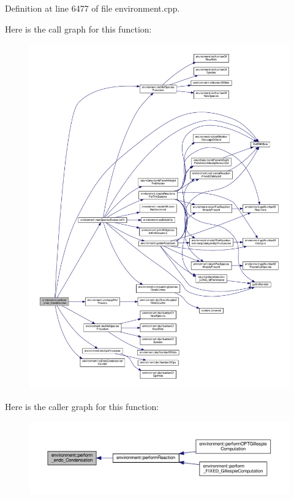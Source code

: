 Definition at line 6477 of file environment.\-cpp.



Here is the call graph for this function\-:\nopagebreak
\begin{figure}[H]
\begin{center}
\leavevmode
\includegraphics[width=350pt]{a00003_aa7a2cc95d8ba242c805a8fda063b23a7_cgraph}
\end{center}
\end{figure}




Here is the caller graph for this function\-:\nopagebreak
\begin{figure}[H]
\begin{center}
\leavevmode
\includegraphics[width=350pt]{a00003_aa7a2cc95d8ba242c805a8fda063b23a7_icgraph}
\end{center}
\end{figure}


